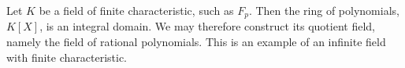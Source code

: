 \documentclass[12pt]{article}
\begin{document}
Let $K$ be a field of finite characteristic, such as $F_p$. Then the ring of polynomials, $K[X]$, is an integral domain. We may therefore construct its quotient field, namely the field of rational polynomials. This is an example of an  infinite field with finite characteristic.
\end{document}
